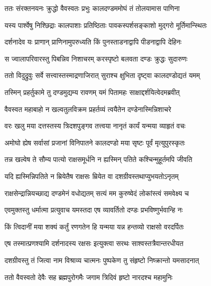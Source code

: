 \twolineshloka
{ततः संरक्तनयनः क्रुद्धो वैवस्वतः प्रभुः}
{कालदण्डममोघं तं तोलयामास पाणिना} %

\twolineshloka
{यस्य पार्श्वेषु निश्छिद्राः कालपाशाः प्रतिष्ठिताः}
{पावकस्पर्शसङ्काशो मुद्गरो मूर्तिमान्स्थितः} %

\twolineshloka
{दर्शनादेव यः प्राणान् प्राणिनामुपरुध्यति}
{किं पुनस्ताडनाद्वापि पीडनाद्वापि देहिनः} %

\twolineshloka
{स ज्वालापरिवारस्तु पिबन्निव निशाचरम्}
{करस्पृष्टो बलवता दण्डः क्रुद्धः सुदारुणः} %

\twolineshloka
{ततो विदुद्रुवुः सर्वे सत्त्वास्तस्माद्रणाजिरात्}
{सुराश्च क्षुभिता दृष्ट्वा कालदण्डोद्यतं यमम्} %

\twolineshloka
{तस्मिन् प्रहर्तुकामे तु दण्डमुद्यम्य रावणम्}
{यमं पितामहः साक्षाद्दर्शयित्वेदमब्रवीत्} %

\twolineshloka
{वैवस्वत महाबाहो न खल्वतुलविक्रम}
{प्रहर्तव्यं त्वयैतेन दण्डेनास्मिन्निशाचरे} %

\twolineshloka
{वरः खलु मया दत्तस्तस्य त्रिदशपुङ्गव}
{तत्त्वया नानृतं कार्यं यन्मया व्याहृतं वचः} %

\twolineshloka
{अमोघो ह्येष सर्वासां प्रजानां विनिपातने}
{कालदण्डो मया सृष्टः पूर्वं मृत्युपुरस्कृतः} %

\twolineshloka
{तन्न खल्वेष ते सौम्य पात्यो राक्षसमूर्धनि}
{न ह्यस्मिन् पतिते कश्चिन्मुहूर्तमपि जीवति} %

\twolineshloka
{यदि ह्यस्मिन्निपतिते न म्रियेतैष राक्षसः}
{म्रियेत वा दशग्रीवस्तथाप्युभयतोऽनृतम्} %

\twolineshloka
{राक्षसेन्द्रान्नियच्छाद्य दण्डमेनं वधोद्यतम्}
{सत्यं मम कुरुष्वेदं लोकांस्त्वं समवेक्ष्य च} %

\twolineshloka
{एवमुक्तस्तु धर्मात्मा प्रत्युवाच यमस्तदा}
{एष व्यावर्तितो दण्डः प्रभविष्णुर्भवान्हि नः} %

\twolineshloka
{किं त्विदानीं मया शक्यं कर्तुं रणगतेन हि}
{यन्मया यन्न हन्तव्यो राक्षसो वरदर्पितः} %

\twolineshloka
{एष तस्मात्प्रणश्यामि दर्शनादस्य रक्षसः}
{इत्युक्त्वा सरथः साश्वस्तत्रैवान्तरधीयत} %

\twolineshloka
{दशग्रीवस्तु तं जित्वा नाम विश्राव्य चात्मनः}
{पुष्पकेण तु संहृष्टो निष्क्रान्तो यमसादनात्} %

\twolineshloka
{ततो वैवस्वतो देवैः सह ब्रह्मपुरोगमैः}
{जगाम त्रिदिवं हृष्टो नारदश्च महामुनिः} %


